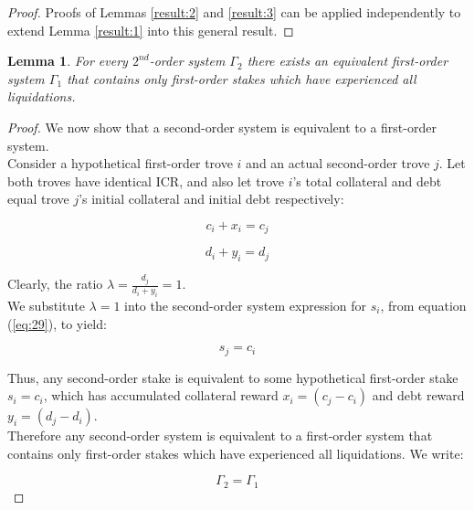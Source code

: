 \documentclass[reqno]{article}
\newtheorem{lemma}[theorem]{Lemma}
\begin{document}
\begin{proof}
  Proofs of Lemmas \ref{result:2} and \ref{result:3} can be applied independently to extend Lemma \ref{result:1} into this general result.
\end{proof}

\begin{lemma} \label{result:5}
  For every $2^{nd}$-order system $\Gamma_2$ there exists an equivalent first-order system $\Gamma_1$ that contains only first-order stakes which have experienced all liquidations.
\end{lemma}

\begin{proof}
We now show that a second-order system is equivalent to a first-order system.\\

Consider a hypothetical first-order trove $i$ and an actual second-order trove $j$. Let both troves have identical ICR, and also let trove $i$’s total collateral and debt equal trove $j$’s initial collateral and initial debt respectively:

\begin{equation} 
    c_i+x_i=c_j
\end{equation}

\begin{equation} 
    d_i+y_i=d_j
\end{equation}

\bigskip
Clearly, the ratio  $\lambda = \frac{d_j}{d_i+y_i} = 1$.\\

We substitute $\lambda=1$ into the second-order system expression for $s_i$, from equation (\ref{eq:29}), to yield:

\begin{equation} 
    s_j=c_i
\end{equation}

\bigskip
Thus, any second-order stake is equivalent to some hypothetical first-order stake $s_i=c_i$, which has accumulated collateral reward $x_i=(c_j-c_i)$ and debt reward $y_i=(d_j-d_i)$.\\

Therefore any second-order system is equivalent to a first-order system that contains only first-order stakes which have experienced all liquidations. We write:

\begin{equation} 
    \Gamma_2=\Gamma_1
\end{equation}
\end{proof}
\end{document}
